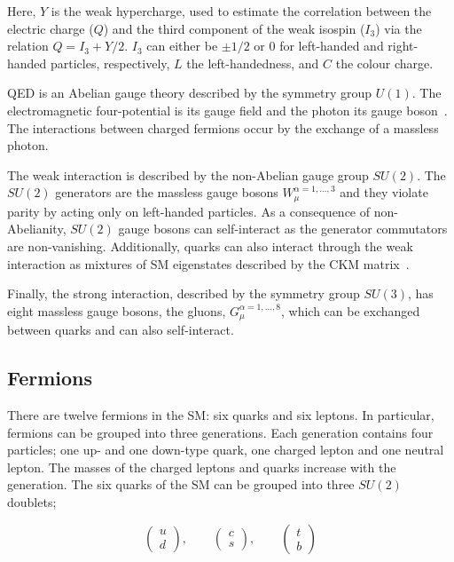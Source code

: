 			\noindent Here, $Y$ is the weak hypercharge, used to estimate the correlation between the electric charge ($Q$) and the third component of the weak isospin ($I_3$) via the relation $Q = I_3 + Y/2$. $I_3$ can either be $\pm 1/2$ or $0$ for left-handed and right-handed particles, respectively, $L$ the left-handedness, and $C$ the colour charge. 

			\ac{QED} is an Abelian gauge theory described by the symmetry group $U(1)$. The electromagnetic four-potential is its gauge field and the photon its gauge boson~\cite{Pich2012}. The interactions between charged fermions occur by the exchange of a massless photon. 

			The weak interaction is described by the non-Abelian gauge group $SU(2)$. The $SU(2)$ generators are the massless gauge bosons $W_{\mu}^{\alpha = 1,\dots,3}$ and they violate parity by acting only on left-handed particles. As a consequence of non-Abelianity, $SU(2)$ gauge bosons can self-interact as the generator commutators are non-vanishing. Additionally, quarks can also interact through the weak interaction as mixtures of \ac{SM} eigenstates described by the CKM matrix~\cite{PDG}.

			Finally, the strong interaction, described by the symmetry group $SU(3)$, has eight massless gauge bosons, the gluons, $G_{\mu}^{\alpha=1,\dots,8}$, which can be exchanged between quarks and can also self-interact. 



		\subsection*{Fermions}

			There are twelve fermions in the \ac{SM}: six quarks and six leptons. In particular, fermions can be grouped into three generations. Each generation contains four particles; one up- and one down-type quark, one charged lepton and one neutral lepton. The masses of the charged leptons and quarks increase with the generation. The six quarks of the \ac{SM} can be grouped into three $SU(2)$ doublets;

			\begin{equation*}
			\label{eq:quark_doublets}
				\begin{pmatrix} u \\ d \end{pmatrix}, \qquad 
				\begin{pmatrix} c \\ s \end{pmatrix}, \qquad 
				\begin{pmatrix} t \\ b \end{pmatrix}
			\end{equation*}

